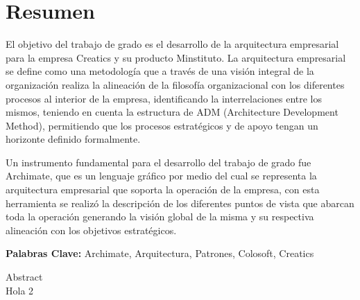 \chapter*{Resumen}
\label{sec:resumen}
\vspace*{-10mm}
El objetivo del trabajo de grado es el desarrollo de la arquitectura empresarial para la empresa Creatics y su producto Minstituto. La arquitectura empresarial se define como una metodología que a través de una visión integral de la organización realiza la alineación de la filosofía organizacional con los diferentes procesos al interior de la empresa, identificando la interrelaciones entre los mismos, teniendo en cuenta la estructura de ADM (Architecture Development Method), permitiendo que los procesos estratégicos y de apoyo tengan un horizonte definido formalmente.

Un instrumento fundamental para el desarrollo del trabajo de grado fue Archimate, que es un lenguaje gráfico por medio del cual se representa la arquitectura empresarial que soporta la operación de la empresa, con esta herramienta se realizó la descripción de los diferentes puntos de vista que abarcan toda la operación generando la visión global de la misma y su respectiva alineación con los objetivos estratégicos.

{\large\textbf{Palabras Clave:}}
Archimate, Arquitectura, Patrones, Colosoft, Creatics

\vspace*{20mm}
{Abstract}
\label{sec:abstract} \\
Hola 2
